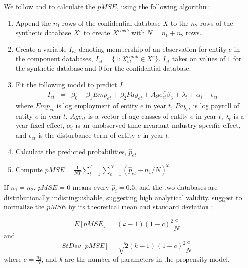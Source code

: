We follow  \textcite{Woo_Reiter_Oganian_Karr_2009} and \textcite{SnokeSlavkovic2018} to calculate the $pMSE$, using the following algorithm:  
\begin{enumerate}
    \item Append the $n_1$ rows of the confidential database $X$ to the $n_2$ rows of the synthetic database $X^s$ to create $X^{comb}$ with $N=n_1 + n_2$ rows.
    \item Create a variable $I_{et}$ denoting membership of an observation for entity $e$ in the component databases,  $I_{et}=\{1: X^{comb}_{et} \in X^s\}$. $I_{et}$ takes on values of $1$ for the synthetic database and $0$ for the confidential database. 
    \item Fit the following model to predict $I$
    \begin{eqnarray}	
        I_{et} & = &\beta_0 + \beta_{1} Emp_{et} + \beta_{2} Pay_{et} + Age_{et}^{T}\beta_{3} + \lambda_t + \alpha_i + \epsilon_{et} \label{pMSE}
     \end{eqnarray}
         where $Emp_{et}$ is  log employment  of entity $e$ in year $t$, $Pay_{et}$ is  log payroll of entity $e$ in year $t$, $Age_{et}$ is a vector of age classes of entity $e$ in year $t$, $\lambda_t$ is a year fixed effect, $\alpha_i$ is an unobserved time-invariant industry-specific effect, and $\epsilon_{et}$ is the disturbance term of entity $e$ in year $t$. 
    \item Calculate the predicted probabilities, $\hat{p}_{et}$
    \item Compute  $pMSE=\frac{1}{NT}\sum_{t=1}^T\sum_{e=1}^N(\hat{p}_{et} - n_1/N)^2$
\end{enumerate}
If $n_1 = n_2$, $pMSE$ = 0 means every $\hat{p}_i = 0.5$, and the two databases are distributionally indistinguishable, suggesting  high analytical validity. \textcite{Snoke_RSSA2018} suggest to normalize the $pMSE$ by its theoretical mean and standard deviation \parencite[Equation 1]{Snoke_RSSA2018}:

$$
E[pMSE] = (k-1)(1-c)^2 \frac{c}{N}
$$
and
$$
StDev[pMSE] = \sqrt{2(k-1)}(1-c)^2 \frac{c}{N}
$$
where $c = \frac{n_2}{N}$, and $k$ are the number of parameters in the propensity model. 

